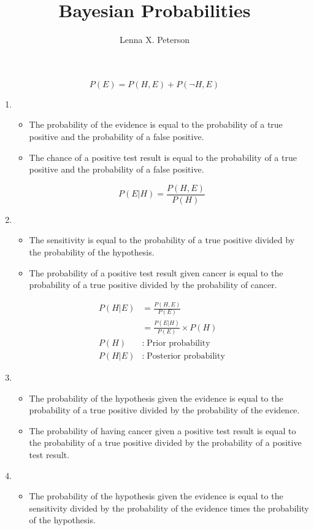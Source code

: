 \documentclass[12pt,a4paper]{report}
\author{Lenna X. Peterson}
\title{Bayesian Probabilities}
\begin{document}
\maketitle

\begin{equation}
P(E) = P(H,E) + P(\neg H, E)
\end{equation}

\begin{enumerate}
\item
	\begin{itemize}
		\item The probability of the evidence is equal to the probability of a true positive and the probability of a false positive.
		\item The chance of a positive test result is equal to the probability of a true positive and the probability of a false positive.
	\end{itemize}
\begin{equation}
P(E|H) = \frac{P(H,E)}{P(H)}
\end{equation}
\item 
	\begin{itemize}
		\item  The sensitivity is equal to the probability of a true positive divided by the probability of the hypothesis.
		\item The probability of a positive test result given cancer is equal to the probability of a true positive divided by the probability of cancer.
	\end{itemize}

\begin{align}
P(H|E) &= \frac{P(H,E)}{P(E)} \\
&= \frac{P(E|H)}{P(E)} \times P(H) \\
P(H) &: \; \text{Prior probability} \nonumber \\
P(H|E) &: \; \text{Posterior probability} \nonumber
\end{align}
\item 
	\begin{itemize} 
		\item The probability of the hypothesis given the evidence is equal to the probability of a true positive divided by the probability of the evidence. 
		\item The probability of having cancer given a positive test result is equal to the probability of a true positive divided by the probability of a positive test result.
	\end{itemize}
\item 
	\begin{itemize} 
		\item The probability of the hypothesis given the evidence is equal to the sensitivity divided by the probability of the evidence times the probability of the hypothesis.


\end{itemize}
\end{enumerate}
\end{document}
